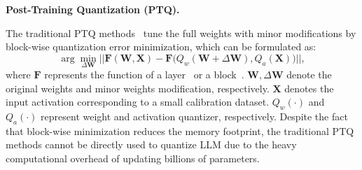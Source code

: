 \documentclass{article} %
\begin{document}


\textbf{Post-Training Quantization (PTQ).} 

The traditional PTQ methods~\citep{gptq,adaround,brecq,qdrop} tune the full weights with minor modifications by block-wise quantization error minimization, which can be formulated as:
\begin{equation}\label{eq:deltaW-PTQ}
    \arg\min_{\Delta\mathbf{{W}}} \lvert\lvert \mathbf{F}(\mathbf{W},\mathbf{X}) - \mathbf{F}\big(Q_w(\mathbf{W}+\Delta\mathbf{{W}}),Q_a(\mathbf{X})\big) \rvert\rvert,
\end{equation}
where $\mathbf{F}$ represents the function of a layer~\citep{gptq,adaround} or a block~\citep{brecq,qdrop}. $\mathbf{W},\Delta\mathbf{{W}}$ denote the original weights and minor weights modification, respectively. $\mathbf{X}$ denotes the input activation corresponding to a small calibration dataset. $Q_w(\cdot)$ and $Q_a(\cdot)$ represent weight and activation quantizer, respectively. 
Despite the fact that block-wise minimization reduces the memory footprint, the traditional PTQ methods cannot be directly used to quantize LLM due to the heavy computational overhead of updating billions of parameters.
\fi
%
\end{document}
